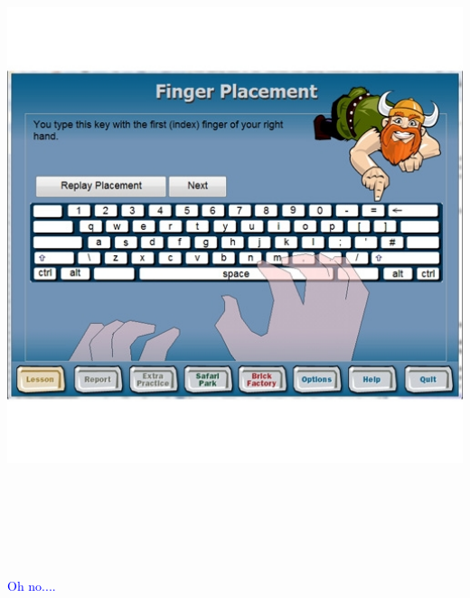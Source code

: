 \documentclass[landscape]{slides}
\begin{document}
\begin{slide}

    \centering

    \includegraphics[height=19cm]{ten-thumbs}

\end{slide}


\begin{slide}

    \textcolor{blue}{\Large{Oh no....}}

\end{slide}
\end{document}
